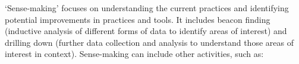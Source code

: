 `Sense-making' focuses on understanding the current practices and identifying potential improvements in practices and tools.  It includes beacon finding (inductive analysis of different forms of data to identify areas of interest) and drilling down (further data collection and analysis to understand those areas of interest in context). Sense-making can include other activities, such as:
 

